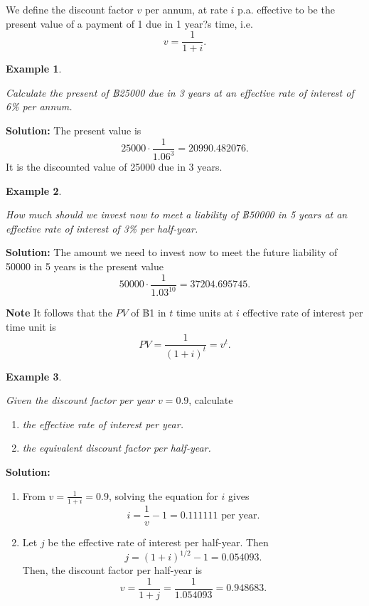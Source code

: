 \documentclass[landscape, 20pt]{extreport}
\theoremstyle{definition}
\theoremstyle{definition}
\newtheorem{example}{Example}[chapter]
\theoremstyle{definition}
\theoremstyle{definition}
\theoremstyle{remark}
\begin{document}
We define the discount factor \(v\) per annum, at rate \(i\) p.a. effective
to be the present value of a payment of 1 due in 1 year?s time, i.e.
\[v = \frac{1}{1+i}.\]

\newpage \begin{example}
\protect\hypertarget{exm:unlabeled-div-21}{}\label{exm:unlabeled-div-21}

\emph{Calculate the present of ฿25000 due in 3 years at an effective rate of
interest of 6\% per annum.}

\end{example}

\textbf{Solution:} The present value is
\[25000 \cdot \frac{1}{1.06^3} = 20990.482076.\] It is the discounted
value of 25000 due in 3 years.

\newpage \begin{example}
\protect\hypertarget{exm:unlabeled-div-22}{}\label{exm:unlabeled-div-22}

\emph{How much should we invest now to meet a liability of ฿50000 in 5 years
at an effective rate of interest of 3\% per half-year.}

\end{example}

\textbf{Solution:} The amount we need to invest now to meet the future
liability of 50000 in 5 years is the present value
\[50000 \cdot \frac{1}{1.03^{10}} = 37204.695745.\]

\textbf{Note} It follows that the \(PV\) of ฿1 in \(t\) time units at \(i\)
effective rate of interest per time unit is
\[PV = \frac{1}{(1+i)^t} = v^t.\]

\newpage \begin{example}
\protect\hypertarget{exm:unlabeled-div-23}{}\label{exm:unlabeled-div-23}

\emph{Given the discount factor per year} \(v = 0.9\), calculate

\begin{enumerate}
\def\labelenumi{\arabic{enumi}.}
\item
  \emph{the effective rate of interest per year.}
\item
  \emph{the equivalent discount factor per half-year.}
\end{enumerate}

\end{example}

\textbf{Solution:}

\begin{enumerate}
\def\labelenumi{\arabic{enumi}.}
\item
  From \(\displaystyle{ v= \frac{1}{1+i} = 0.9}\), solving the equation
  for \(i\) gives \[i = \frac{1}{v} - 1 = 0.111111 \text{ per year}.\]
\item
  Let \(j\) be the effective rate of interest per half-year. Then
  \[j = (1+ i)^{1/2} -1 = 0.054093.\] Then, the discount factor per
  half-year is \[v = \frac{1}{1+j} = \frac{1}{1.054093} = 0.948683.\]
\end{enumerate}
\end{document}
